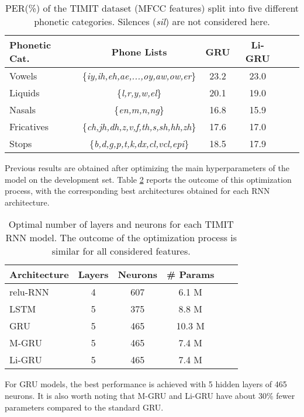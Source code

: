 \documentclass[journal]{IEEEtran}
\begin{document}
\begin{table}[t!]
\centering
\tabcolsep=0.20cm
    \begin{tabular}{  | l | c | c | c | c | c |}
    \cline{1-4}
Phonetic Cat. & Phone Lists & GRU & Li-GRU  \\ \hline
Vowels & \{\textit{iy,ih,eh,ae,...,oy,aw,ow,er}\} & 23.2 & 23.0  \\ \hline
Liquids & \{\textit{l,r,y,w,el}\} & 20.1 & 19.0  \\ \hline
Nasals & \{\textit{en,m,n,ng}\} & 16.8 & 15.9 \\ \hline
Fricatives & \{\textit{ch,jh,dh,z,v,f,th,s,sh,hh,zh}\} & 17.6 & 17.0 \\ \hline
Stops & \{\textit{b,d,g,p,t,k,dx,cl,vcl,epi}\} & 18.5 & 17.9 \\ \hline  
    \end{tabular}
\caption{PER(\%) of the TIMIT dataset (MFCC features) split into five different phonetic categories. Silences (\textit{sil}) are not considered here.}
\label{tab:res_ph}
\end{table}

Previous results are obtained after optimizing the main hyperparameters of the model on the development set. Table \ref{tab:opt} reports the outcome of this optimization process, with the corresponding best architectures obtained for each RNN architecture.
 \begin{table}[t!]
 \centering
 \tabcolsep=0.25cm
     \begin{tabular}{  | l | c | c | c | c | c |}
     \cline{1-4}
 Architecture & Layers & Neurons & \# Params  \\ \hline
 relu-RNN & 4 & 607 & 6.1 M   \\ \hline
 LSTM & 5 & 375 & 8.8 M   \\ \hline
 GRU & 5 & 465  & 10.3 M  \\ \hline
 M-GRU & 5 & 465 & 7.4 M  \\ \hline
 Li-GRU & 5 & 465 & 7.4 M  \\ \hline  
     \end{tabular}
 \caption{Optimal number of layers and neurons for each TIMIT RNN model. The outcome of the optimization process is similar for all considered features.}
 \label{tab:opt}
 \end{table}
For GRU models, the best performance is achieved with 5 hidden layers of 465 neurons. It is also worth noting that M-GRU and Li-GRU have about 30\% fewer parameters compared to the standard GRU.
\end{document}
